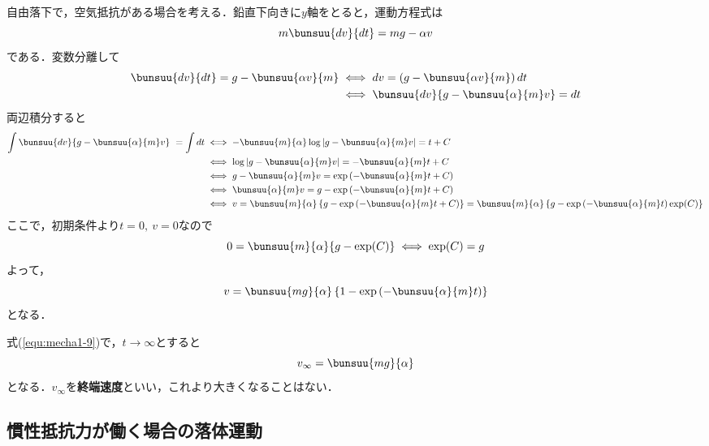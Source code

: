 自由落下で，空気抵抗がある場合を考える．鉛直下向きに$y$軸をとると，運動方程式は
\begin{equation}
	m\bunsuu{dv}{dt} = mg - \alpha v
\end{equation}
である．変数分離して
\begin{align*}
	\bunsuu{dv}{dt} = g - \bunsuu{\alpha v}{m} &
	\iff dv = \left(g - \bunsuu{\alpha v}{m}\right)dt\\
	& \iff \bunsuu{dv}{g - \bunsuu{\alpha}{m}v} = dt
\end{align*}
両辺積分すると
\begin{align*}
	\int \bunsuu{dv}{g - \bunsuu{\alpha}{m}v}\ = \int dt
	&\iff -\bunsuu{m}{\alpha}\log\left|g - \bunsuu{\alpha}{m}v\right| = t + C\\
	&\iff \log\left|g - \bunsuu{\alpha}{m}v\right| = -\bunsuu{\alpha}{m}t + C\\
	&\iff g - \bunsuu{\alpha}{m}v = \exp\left(-\bunsuu{\alpha}{m}t + C\right)\\
	&\iff \bunsuu{\alpha}{m} v = g - \exp\left(-\bunsuu{\alpha}{m}t + C\right)\\
	&\iff v = \bunsuu{m}{\alpha}\left\{g - \exp\left(-\bunsuu{\alpha}{m}t + C\right)\right\} = \bunsuu{m}{\alpha}\left\{g - \exp\left(-\bunsuu{\alpha}{m}t\right)\exp(C)\right\}
\end{align*}
ここで，初期条件より$t = 0,\ v = 0$なので
\begin{equation*}
	0 = \bunsuu{m}{\alpha}\{g - \exp(C)\} \iff \exp(C) = g
\end{equation*}
よって，
\begin{equation}
	v = \bunsuu{mg}{\alpha}\left\{1 - \exp\left(-\bunsuu{\alpha}{m}t\right)\right\} \label{equ:mecha1-9}
\end{equation}
となる．

式(\ref{equ:mecha1-9})で，$t \to \infty$とすると
\begin{equation}
	v_{\infty} = \bunsuu{mg}{\alpha}
\end{equation}
となる．$v_{\infty}$を\textbf{終端速度}といい，これより大きくなることはない．



\subsection{慣性抵抗力が働く場合の落体運動}

